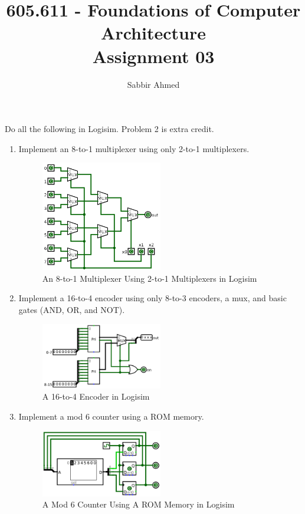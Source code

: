 \documentclass[12pt]{article}
\begin{document}
  \title{605.611 - Foundations of Computer Architecture \\ Assignment 03\vspace{-0.5em}}
  \author{Sabbir Ahmed}
  \maketitle
  \vspace{-1em}

  Do all the following in Logisim.  Problem 2 is extra credit.

  \begin{enumerate}
    \item Implement an 8-to-1 multiplexer using only 2-to-1 multiplexers.
    \begin{figure}[h]
      \centering
      \includegraphics[width=0.5\textwidth]{assn/03/media/01.png}
      \caption{An 8-to-1 Multiplexer Using 2-to-1 Multiplexers in Logisim}
    \end{figure}
    \clearpage

    \item Implement a 16-to-4 encoder using only 8-to-3 encoders, a mux, and basic gates (AND, OR, and NOT).
    \begin{figure}[h]
      \centering
      \includegraphics[width=0.5\textwidth]{assn/03/media/02.png}
      \caption{A 16-to-4 Encoder in Logisim}
    \end{figure}

    \item Implement a mod 6 counter using a ROM memory.
    \begin{figure}[h]
      \centering
      \includegraphics[width=0.5\textwidth]{assn/03/media/03.png}
      \caption{A Mod 6 Counter Using A ROM Memory in Logisim}
    \end{figure}


\end{enumerate}
\end{document}
